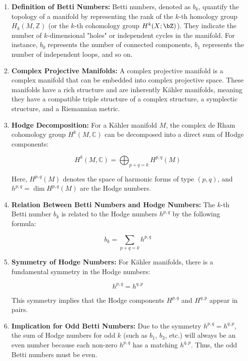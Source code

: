\documentclass[lang=en,12pt]{beautybook}
\begin{document}
\begin{enumerate}
  \item \textbf{Definition of Betti Numbers:}
        Betti numbers, denoted as $b_k$, quantify the topology of a manifold by representing the rank of the $k$-th homology group $H_k(M, \mathbb{Z})$ (or the $k$-th cohomology group $H^k(X;\bZ)$). They indicate the number of $k$-dimensional "holes" or independent cycles in the manifold. For instance, $b_0$ represents the number of connected components, $b_1$ represents the number of independent loops, and so on.

  \item \textbf{Complex Projective Manifolds:}
        A complex projective manifold is a complex manifold that can be embedded into complex projective space. These manifolds have a rich structure and are inherently Kähler manifolds, meaning they have a compatible triple structure of a complex structure, a symplectic structure, and a Riemannian metric.

  \item \textbf{Hodge Decomposition:}
        For a Kähler manifold $M$, the complex de Rham cohomology group $H^k(M, \mathbb{C})$ can be decomposed into a direct sum of Hodge components:

        $$
          H^k(M, \mathbb{C}) = \bigoplus_{p+q=k} H^{p,q}(M)
        $$

        Here, $H^{p,q}(M)$ denotes the space of harmonic forms of type $(p, q)$, and $h^{p,q} = \dim H^{p,q}(M)$ are the Hodge numbers.

  \item \textbf{Relation Between Betti Numbers and Hodge Numbers:}
        The $k$-th Betti number $b_k$ is related to the Hodge numbers $h^{p,q}$ by the following formula:

        $$
          b_k = \sum_{p+q=k} h^{p,q}
        $$

  \item \textbf{Symmetry of Hodge Numbers:}
        For Kähler manifolds, there is a fundamental symmetry in the Hodge numbers:

        $$
          h^{p,q} = h^{q,p}
        $$

        This symmetry implies that the Hodge components $H^{p,q}$ and $H^{q,p}$ appear in pairs.

  \item \textbf{Implication for Odd Betti Numbers:}
        Due to the symmetry $h^{p,q} = h^{q,p}$, the sum of Hodge numbers for odd $k$ (such as $b_1$, $b_3$, etc.) will always be an even number because each non-zero $h^{p,q}$ has a matching $h^{q,p}$. Thus, the odd Betti numbers must be even.


\end{enumerate}
\end{document}
